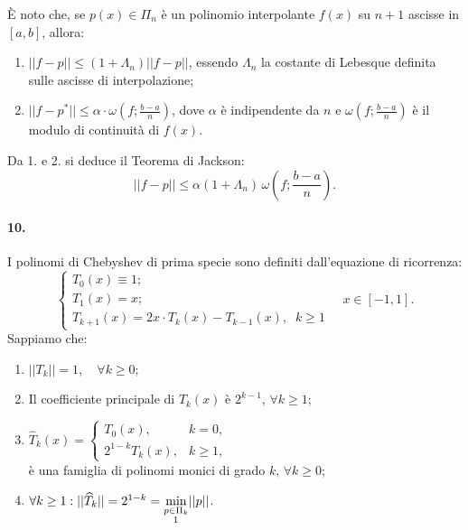 \noindent È noto che, se $p(x)\in\Pi_n$ è un polinomio interpolante $f(x)$ su $n+1$ ascisse in $[a,b]$, allora:
\begin{enumerate}
    \item $||f-p||\leq (1+\Lambda_n)||f-p||$, essendo $\Lambda_n$ la costante di Lebesque definita sulle ascisse di interpolazione;
    \item $||f-p^*||\leq \alpha\cdot\omega\left(f;\frac{b-a}{n}\right)$, dove $\alpha$ è indipendente da $n$ e $\omega\left(f;\frac{b-a}{n}\right)$ è il modulo di continuità di $f(x)$.\\
\end{enumerate}
Da 1. e 2. si deduce il Teorema di Jackson:
\begin{equation*}
    ||f-p||\leq\alpha(1+\Lambda_n)\,\omega\left(f;\frac{b-a}{n}\right).
\end{equation*}

\paragraph{10.} I polinomi di Chebyshev di prima specie sono definiti dall'equazione di ricorrenza:
\begin{equation*}
    \begin{cases}
        T_0(x) \equiv 1;\\
        T_1(x) = x;\\
        T_{k+1}(x) = 2x\cdot T_k(x)-T_{k-1}(x),\;\; k\geq 1
    \end{cases}\quad x\in[-1,1].
\end{equation*}
Sappiamo che:
\begin{enumerate}
    \item $||T_k||=1,\quad\forall k\geq 0$;
    \item Il coefficiente principale di $T_k(x)$ è $2^{k-1},\, \forall k\geq 1$;
    \item $\widehat T_k(x)=
    \begin{cases}
    T_0(x), &k=0,\\
    2^{1-k}T_k(x), &k\geq 1,
    \end{cases}$\\
    è una famiglia di polinomi monici di grado $k,\,\forall k\geq 0$;
    \item $\forall k\geq 1:||\widehat T_k||=2^{1-k}=\underset{\underset{\footnotemark}{p\in\Pi_k}}{\min}||p||$.
\end{enumerate}

